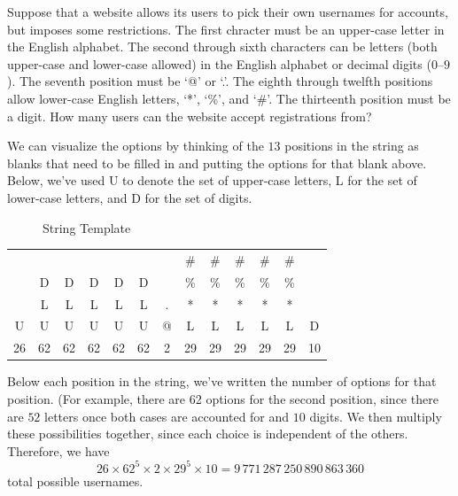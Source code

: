 \begin{example}
  Suppose that a website allows its users to pick their own usernames
  for accounts, but imposes some restrictions. The first chracter must
  be an upper-case letter in the English alphabet. The second through
  sixth characters can be letters (both upper-case and lower-case
  allowed) in the English alphabet or decimal digits ($0$--$9$). The
  seventh position must be `@' or `.'. The eighth through twelfth
  positions allow lower-case English letters, `*', `\%',
  and `\#'. The thirteenth position must be a digit. How many users
  can the website accept registrations from?

  We can visualize the options by thinking of the $13$
  positions in the string as blanks that need to be filled in and
  putting the options for that blank above. Below, we've used U to
  denote the set of upper-case letters, L for the set of lower-case
  letters, and D for the set of digits.
  \begin{figure}[h]
    \centering
    \caption{String Template}
    \label{fig:string-template}
  \end{figure}
  \begin{center}
    \begin{tabular}{ccccccccccccc}
      &&&&&&&\#&\#&\#&\#&\#&\\
      &D&D&D&D&D&&\%&\%&\%&\%&\%&\\
      &L&L&L&L&L&.&*&*&*&*&*&\\
      U&U&U&U&U&U&@&L&L&L&L&L&D\\\hline
      26 & 62 & 62 & 62 & 62 & 62 & 2 & 29 & 29 & 29 & 29 & 29 & 10
    \end{tabular}
  \end{center}
  \noindent Below each position in the string, we've written the
  number of options for that position. (For example, there are 62
  options for the second position, since there are $52$ letters once
  both cases are accounted for and $10$ digits. We then multiply these
  possibilities together, since each choice is independent of the
  others. Therefore, we have
  \[26\times 62^5 \times 2 \times 29^5\times 10 = 
  9\,771\,287\,250\,890\,863\,360\]
  total possible usernames.
\end{example}

